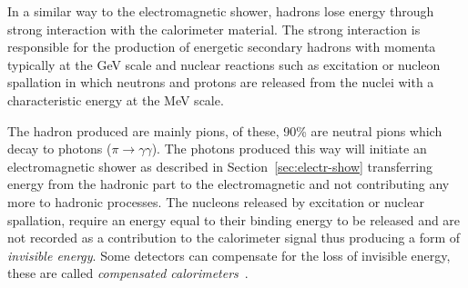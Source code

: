 In a similar way to the electromagnetic shower, hadrons lose energy through
strong interaction with the calorimeter material. The strong interaction is
responsible for the production of energetic secondary hadrons with momenta
typically at the GeV scale and nuclear reactions such as excitation or nucleon
spallation in which neutrons and protons are released from the nuclei with a
characteristic energy at the MeV scale.

The hadron produced are mainly pions, of these, 90\% are neutral pions which
decay to photons ($\pi \rightarrow \gamma \gamma$). The photons produced this
way will initiate an electromagnetic shower as described in
Section~\ref{sec:electr-show} transferring energy from the hadronic part to the
electromagnetic and not contributing any more to hadronic processes. The
nucleons released by excitation or nuclear spallation, require an energy equal
to their binding energy to be released and are not recorded as a contribution to
the calorimeter signal thus producing a form of \emph{invisible energy}. Some
detectors can compensate for the loss of invisible energy, these are called
\emph{compensated calorimeters}~\cite{Calorimetry}.
